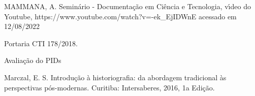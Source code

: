 \documentclass[
12pt,		%
openright,	%
twoside,  %
a4paper,			%
chapter=TITLE,		%
english,			%
french,				%
spanish,			%
brazil				%
]{USPSC-classe/USPSC}
\begin{document}
\begin{flushleft}
\begin{flushleft}
\begin{flushleft}
\begin{flushleft}
[MAMMANA, 2020] MAMMANA, A. Semin\'ario - Documenta\c{c}\~ao em Ci\^encia e Tecnologia, v\'{\i}deo do Youtube, https://www.youtube.com/watch?v=-ek\_EjIDWnE acessado em 12/08/2022
\end{flushleft}


\end{flushleft}


\end{flushleft}


\end{flushleft}


\begin{flushleft}
\begin{flushleft}
\begin{flushleft}
\begin{flushleft}
[CTI, 2018] Portaria CTI 178/2018.
\end{flushleft}


\end{flushleft}


\end{flushleft}


\end{flushleft}


\begin{flushleft}
\begin{flushleft}
\begin{flushleft}
\begin{flushleft}
[CGEE, 2010] Avalia\c{c}\~ao do PIDs
\end{flushleft}


\end{flushleft}


\end{flushleft}


\end{flushleft}


\begin{flushleft}
\begin{flushleft}
\begin{flushleft}
\begin{flushleft}
[Marczal, 2016] Marczal, E. S. Introdu\c{c}\~ao \`a historiografia: da abordagem tradicional \`as perspectivas p\'os-modernas. Curitiba: Intersaberes, 2016, 1a Edi\c{c}\~ao.
\end{flushleft}


\end{flushleft}


\end{flushleft}


\end{flushleft}
\end{document}
